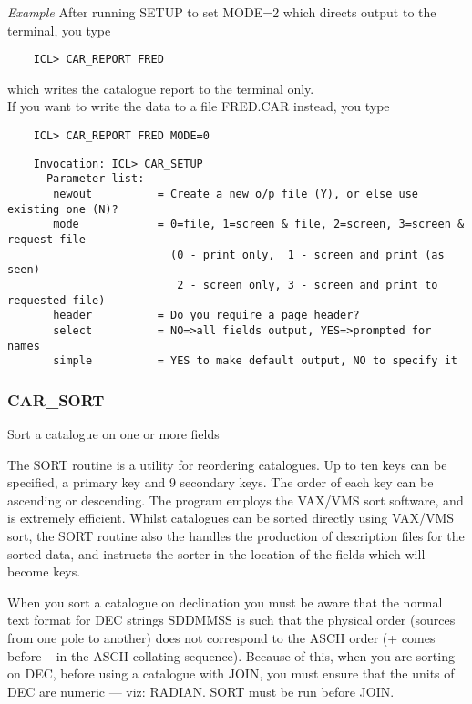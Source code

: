 {\em Example} After running SETUP to set MODE=2 which directs output to the
terminal, you type
\begin{verbatim}
    ICL> CAR_REPORT FRED
\end{verbatim}
which writes the catalogue report to the terminal only.\\
If you want to write the data to a file FRED.CAR instead, you type
\begin{verbatim}
    ICL> CAR_REPORT FRED MODE=0
\end{verbatim}
\begin{verbatim}
    Invocation: ICL> CAR_SETUP
      Parameter list:
       newout          = Create a new o/p file (Y), or else use existing one (N)?
       mode            = 0=file, 1=screen & file, 2=screen, 3=screen & request file
                         (0 - print only,  1 - screen and print (as seen)
                          2 - screen only, 3 - screen and print to requested file)
       header          = Do you require a page header?
       select          = NO=>all fields output, YES=>prompted for names
       simple          = YES to make default output, NO to specify it
\end{verbatim}

\subsubsection{CAR\_SORT}

Sort a catalogue on one or more fields

The SORT routine is a utility for reordering catalogues.
Up to ten keys can be specified, a primary key and 9 secondary keys.
The order of each key can be ascending or descending.
The program employs the VAX/VMS sort software, and is extremely efficient.
Whilst catalogues can be sorted directly using VAX/VMS sort, the SORT
routine also the handles the production of description files for the sorted
data, and instructs the sorter in the location of the fields which will
become keys.

When you sort a catalogue on declination you must be aware that the normal
text format for DEC strings SDDMMSS is such that the physical order (sources
from one pole to another) does not correspond to the ASCII order (+ comes
before -- in the ASCII collating sequence).
Because of this, when you are sorting on DEC, before using a catalogue with
JOIN, you must ensure that the units of DEC are numeric --- viz: RADIAN.
SORT must be run before JOIN.

